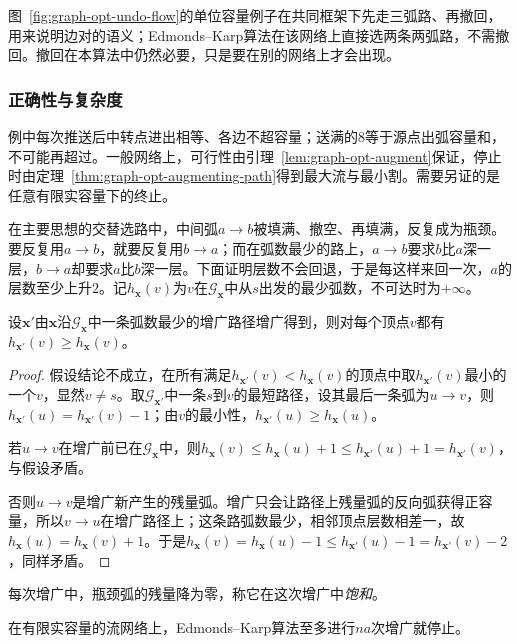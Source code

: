 图~\ref{fig:graph-opt-undo-flow}的单位容量例子在共同框架下先走三弧路、再撤回，用来说明边对的语义；Edmonds--Karp算法在该网络上直接选两条两弧路，不需撤回。撤回在本算法中仍然必要，只是要在别的网络上才会出现。

\subsubsection{正确性与复杂度}

例中每次推送后中转点进出相等、各边不超容量；送满的$8$等于源点出弧容量和，不可能再超过。一般网络上，可行性由引理~\ref{lem:graph-opt-augment}保证，停止时由定理~\ref{thm:graph-opt-augmenting-path}得到最大流与最小割。需要另证的是任意有限实容量下的终止。

在主要思想的交替选路中，中间弧$a\to b$被填满、撤空、再填满，反复成为瓶颈。要反复用$a\to b$，就要反复用$b\to a$；而在弧数最少的路上，$a\to b$要求$b$比$a$深一层，$b\to a$却要求$a$比$b$深一层。下面证明层数不会回退，于是每这样来回一次，$a$的层数至少上升$2$。记$h_{\bm x}(v)$为$v$在$\mathcal G_{\bm x}$中从$s$出发的最少弧数，不可达时为$+\infty$。

\begin{lemma}[残量层数单调不减]
\label{lem:graph-opt-levels-monotone}
设$\bm x'$由$\bm x$沿$\mathcal G_{\bm x}$中一条弧数最少的增广路径增广得到，则对每个顶点$v$都有$h_{\bm x'}(v)\geq h_{\bm x}(v)$。
\end{lemma}

\begin{proof}
假设结论不成立，在所有满足$h_{\bm x'}(v)<h_{\bm x}(v)$的顶点中取$h_{\bm x'}(v)$最小的一个$v$，显然$v\neq s$。取$\mathcal G_{\bm x'}$中一条$s$到$v$的最短路径，设其最后一条弧为$u\to v$，则$h_{\bm x'}(u)=h_{\bm x'}(v)-1$；由$v$的最小性，$h_{\bm x'}(u)\geq h_{\bm x}(u)$。

若$u\to v$在增广前已在$\mathcal G_{\bm x}$中，则$h_{\bm x}(v)\leq h_{\bm x}(u)+1\leq h_{\bm x'}(u)+1=h_{\bm x'}(v)$，与假设矛盾。

否则$u\to v$是增广新产生的残量弧。增广只会让路径上残量弧的反向弧获得正容量，所以$v\to u$在增广路径上；这条路弧数最少，相邻顶点层数相差一，故$h_{\bm x}(u)=h_{\bm x}(v)+1$。于是$h_{\bm x}(v)=h_{\bm x}(u)-1\leq h_{\bm x'}(u)-1=h_{\bm x'}(v)-2$，同样矛盾。
\end{proof}

每次增广中，瓶颈弧的残量降为零，称它在这次增广中\emph{饱和}。

\begin{theorem}
\label{thm:graph-opt-edmonds-karp}
在有限实容量的流网络上，Edmonds--Karp算法至多进行$na$次增广就停止。
\end{theorem}

